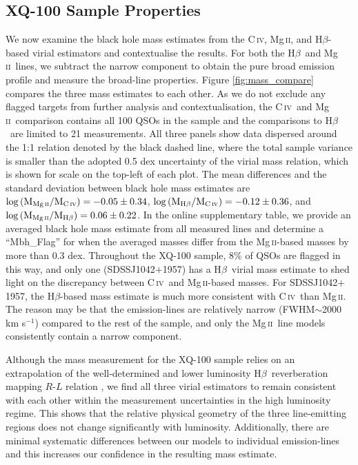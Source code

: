 \documentclass[fleqn,usenatbib]{mnras}
\newcommand{\mgii}{Mg\,\textsc{ii}}
\newcommand{\civ}{C\,\textsc{iv}}
\newcommand{\hbeta}{H\textsc{$\beta$}}
\begin{document}
\subsection{XQ-100 Sample Properties} \label{sec:sample-props}
We now examine the black hole mass estimates from the \civ, \mgii, and \hbeta-based virial estimators and contextualise the results. For both the \hbeta\ and \mgii\ lines, we subtract the narrow component to obtain the pure broad emission profile \citep[e.g.,][]{Kovacevic_2017} and measure the broad-line properties. Figure \ref{fig:mass_compare} compares the three mass estimates to each other. As we do not exclude any flagged targets from further analysis and contextualisation, the \civ\ and \mgii\ comparison contains all 100 QSOs in the sample and the comparisons to \hbeta\ are limited to 21 measurements. All three panels show data dispersed around the 1:1 relation denoted by the black dashed line, where the total sample variance is smaller than the adopted 0.5 dex uncertainty of the virial mass relation, which is shown for scale on the top-left of each plot. The mean differences and the standard deviation between black hole mass estimates are $\log\left(\rm{M_{\mgii}}/\rm{M_{\civ}}\right) = -0.05 \pm 0.34$, $\log\left(\rm{M_{\hbeta}}/\rm{M_{\civ}}\right) = -0.12 \pm 0.36$, and $\log\left(\rm{M_{\mgii}}/\rm{M_{\hbeta}}\right) = 0.06 \pm 0.22$. In the online supplementary table, we provide an averaged black hole mass estimate from all measured lines and determine a ``Mbh\_Flag'' for when the averaged masses differ from the \mgii-based masses by more than 0.3 dex. Throughout the XQ-100 sample, 8\% of QSOs are flagged in this way, and only one (SDSSJ1042$+$1957) has a \hbeta\ virial mass estimate to shed light on the discrepancy between \civ\ and \mgii-based masses. For SDSSJ1042$+$1957, the \hbeta-based mass estimate is much more consistent with \civ\ than \mgii. The reason may be that the emission-lines are relatively narrow (FWHM$\sim$2000 km s$^{-1}$) compared to the rest of the sample, and only the \mgii\ line models consistently contain a narrow component.

Although the mass measurement for the XQ-100 sample relies on an extrapolation of the well-determined and lower luminosity \hbeta\ reverberation mapping $R$-$L$ relation \citep[e.g.,][]{Bentz_2013}, we find all three virial estimators to remain consistent with each other within the measurement uncertainties in the high luminosity regime. This shows that the relative physical geometry of the three line-emitting regions does not change significantly with luminosity. Additionally, there are minimal systematic differences between our models to individual emission-lines and this increases our confidence in the resulting mass estimate. 
\end{document}
